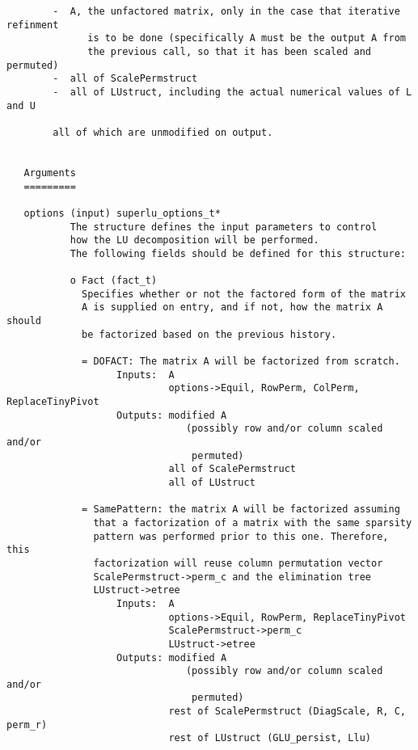 \begin{verbatim}
        -  A, the unfactored matrix, only in the case that iterative refinment
              is to be done (specifically A must be the output A from 
              the previous call, so that it has been scaled and permuted)
        -  all of ScalePermstruct
        -  all of LUstruct, including the actual numerical values of L and U
  
        all of which are unmodified on output.
           
  
   Arguments
   =========
  
   options (input) superlu_options_t*
           The structure defines the input parameters to control
           how the LU decomposition will be performed.
           The following fields should be defined for this structure:
           
           o Fact (fact_t)
             Specifies whether or not the factored form of the matrix
             A is supplied on entry, and if not, how the matrix A should
             be factorized based on the previous history.
  
             = DOFACT: The matrix A will be factorized from scratch.
                   Inputs:  A
                            options->Equil, RowPerm, ColPerm, ReplaceTinyPivot
                   Outputs: modified A
                               (possibly row and/or column scaled and/or 
                                permuted)
                            all of ScalePermstruct
                            all of LUstruct
  
             = SamePattern: the matrix A will be factorized assuming
               that a factorization of a matrix with the same sparsity
               pattern was performed prior to this one. Therefore, this
               factorization will reuse column permutation vector 
               ScalePermstruct->perm_c and the elimination tree
               LUstruct->etree
                   Inputs:  A
                            options->Equil, RowPerm, ReplaceTinyPivot
                            ScalePermstruct->perm_c
                            LUstruct->etree
                   Outputs: modified A
                               (possibly row and/or column scaled and/or 
                                permuted)
                            rest of ScalePermstruct (DiagScale, R, C, perm_r)
                            rest of LUstruct (GLU_persist, Llu)
  

\end{verbatim}
